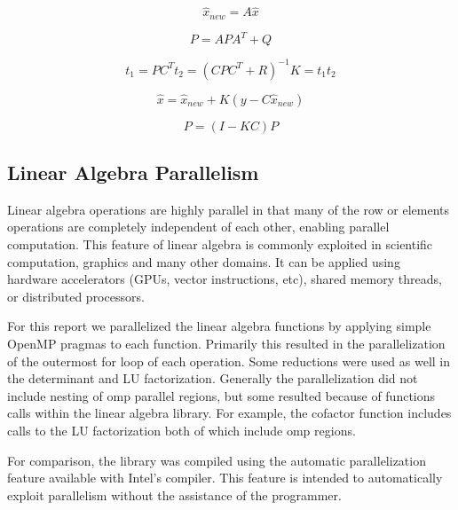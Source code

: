 \begin{equation}
\hat{x}_{new} = A\hat{x}
\end{equation}

\begin{equation}
P=APA^T+Q
\end{equation}

\begin{subequations}
\begin{equation}
t_1 = PC^T
\end{equation}
\begin{equation}
t_2 = (CPC^T+R)^{-1}
\end{equation}
\begin{equation}
K = t_1 t_2
\end{equation}
\end{subequations}

\begin{equation}
\hat{x}=\hat{x}_{new} + K(y-C\hat{x}_{new})
\end{equation}

\begin{equation}
P=(I-KC)P
\end{equation}

\subsection{Linear Algebra Parallelism}
Linear algebra operations are highly parallel in that many of the row or elements operations are completely independent of each other, enabling parallel computation. This feature of linear algebra is commonly exploited in scientific computation, graphics and many other domains. It can be applied using hardware accelerators (GPUs, vector instructions, etc), shared memory threads, or distributed processors.

For this report we parallelized the linear algebra functions by applying simple OpenMP pragmas to each function. Primarily this resulted in the parallelization of the outermost for loop of each operation. Some reductions were used as well in the determinant and LU factorization. Generally the parallelization did not include nesting of omp parallel regions, but some resulted because of functions calls within the linear algebra library. For example, the cofactor function includes calls to the LU factorization both of which include omp regions.

For comparison, the library was compiled using the automatic parallelization feature available with Intel's compiler. This feature is intended to automatically exploit parallelism without the assistance of the programmer.

